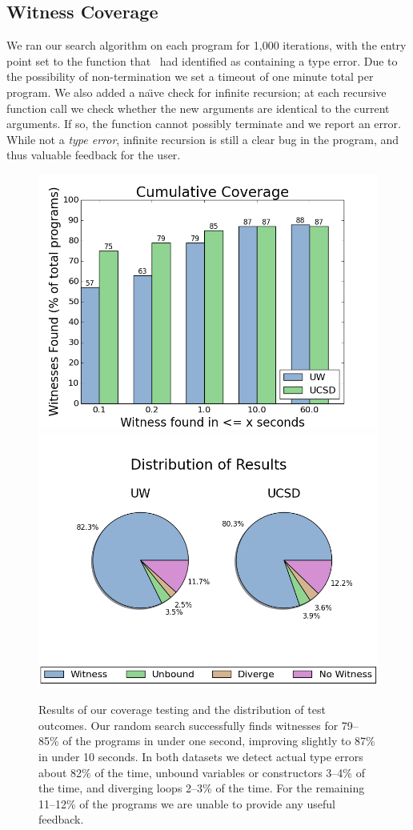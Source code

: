 \subsection{Witness Coverage}
\label{sec:eval:witness-coverage}
%
We ran our search algorithm on each program for 1,000 iterations, with
the entry point set to the function that \ocaml\ had identified as
containing a type error.
%
Due to the possibility of non-termination we set a timeout of one minute
total per program.
%
%
We also added a na{\"\i}ve check for infinite recursion; at each recursive
function call we check whether the new arguments are identical to the
current arguments.
%
If so, the function cannot possibly terminate and we report an error.
%
While not a \emph{type error}, infinite recursion is still a clear bug
in the program, and thus valuable feedback for the user.

\begin{figure}[t]
\centering
\begin{minipage}{\linewidth}
\centering
\includegraphics[width=0.49\linewidth]{coverage.png}
\includegraphics[width=0.49\linewidth]{distrib.png}
\end{minipage}
\caption{Results of our coverage testing and the distribution of test
  outcomes. Our random search successfully finds witnesses for 79--85\% of
  the programs in under one second, improving slightly to 87\% in under
  10 seconds. In both datasets we detect actual type errors about 82\%
  of the time, unbound variables or constructors 3--4\% of the time, and
  diverging loops 2--3\% of the time. For the remaining 11--12\% of the
  programs we are unable to provide any useful feedback.  }
\label{fig:results-witness}
\end{figure}


